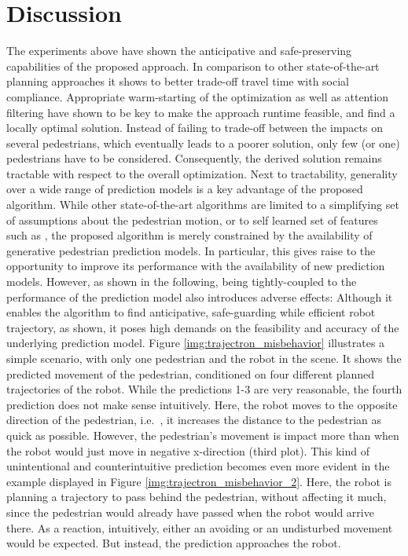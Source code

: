 \section{Discussion}
\label{text:experiments/discussion}
The experiments above have shown the anticipative and safe-preserving capabilities of the proposed approach. In comparison to other state-of-the-art planning approaches it shows to better trade-off travel time with social compliance. Appropriate warm-starting of the optimization as well as attention filtering have shown to be key to make the approach runtime feasible, and find a locally optimal solution. Instead of failing to trade-off between the impacts on several pedestrians, which eventually leads to a poorer solution, only few (or one) pedestrians have to be considered. Consequently, the derived solution remains tractable with respect to the overall optimization. Next to tractability, generality over a wide range of prediction models is a key advantage of the proposed algorithm. While other state-of-the-art algorithms are limited to a simplifying set of assumptions about the pedestrian motion, or to self learned set of features such as \cite{Chen2017}\cite{vandenBerg2011}\cite{Ferrer2013}\cite{Kim2016}, the proposed algorithm is merely constrained by the availability of generative pedestrian prediction models. In particular, this gives raise to the opportunity to improve its performance with the availability of new prediction models. However, as shown in the following, being tightly-coupled to the performance of the prediction model also introduces adverse effects:
\newline
Although it enables the algorithm to find anticipative, safe-guarding while efficient robot trajectory, as shown, it poses high demands on the feasibility and accuracy of the underlying prediction model. Figure \ref{img:trajectron_misbehavior} illustrates a simple scenario, with only one pedestrian and the robot in the scene. It shows the predicted movement of the pedestrian, conditioned on four different planned trajectories of the robot. While the predictions 1-3 are very reasonable, the fourth prediction does not make sense intuitively. Here, the robot moves to the opposite direction of the pedestrian, i.e.\ , it increases the distance to the pedestrian as quick as possible. However, the pedestrian's movement is impact more than when the robot would just move in negative x-direction (third plot). This kind of unintentional and counterintuitive prediction becomes even more evident in the example displayed in Figure \ref{img:trajectron_misbehavior_2}. Here, the robot is planning a trajectory to pass behind the pedestrian, without affecting it much, since the pedestrian would already have passed when the robot would arrive there. As a reaction, intuitively, either an avoiding or an undisturbed movement would be expected. But instead, the prediction approaches the robot. 

